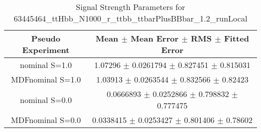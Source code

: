 \begin{table}
\centering
\caption{Signal Strength Parameters for 63445464\_ttHbb\_N1000\_r\_ttbb\_ttbarPlusBBbar\_1.2\_runLocal}
\begin{tabular}{cc}
\toprule
Pseudo Experiment & Mean $\pm$ Mean Error $\pm$ RMS $\pm$ Fitted Error\\
\midrule
nominal S=1.0 & \num{1.07296} $\pm$ \num{0.0261794} $\pm$ \num{0.827451} $\pm$ \num{0.815031}\\
MDFnominal S=1.0 & \num{1.03913} $\pm$ \num{0.0263544} $\pm$ \num{0.832566} $\pm$ \num{0.82423}\\
nominal S=0.0 & \num{0.0666893} $\pm$ \num{0.0252866} $\pm$ \num{0.798832} $\pm$ \num{0.777475}\\
MDFnominal S=0.0 & \num{0.0338415} $\pm$ \num{0.0253427} $\pm$ \num{0.801406} $\pm$ \num{0.78602}\\
\bottomrule
\end{tabular}
\end{table}